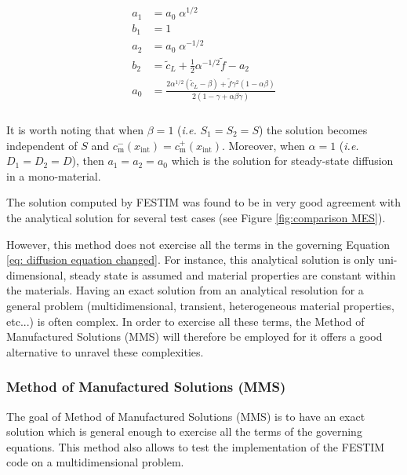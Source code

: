 \begin{align}
    \begin{split}
        a_1 &= a_0 \; \alpha^{1/2}  \\
        b_1 &= 1 \\
        a_2 &= a_0 \; \alpha^{-1/2}\\
        b_2 &= \tilde{c}_L + \frac{1}{2} \alpha^{-1/2} \tilde{f} - a_2 \\
        a_0 &= \frac{2 \alpha^{1/2}( \tilde{c}_L - \beta) + \tilde{f} \gamma^{2} ( 1 - \alpha \beta)}{2 \left( 1  - \gamma + \alpha \beta \gamma \right)} \\
    \end{split}
    \label{eq: MES c coefficients}
\end{align}

It is worth noting that when $\beta=1$ (\textit{i.e.} $S_1 = S_2 = S$) the solution becomes independent of $S$ and {$c_\mathrm{m}^{-}(x_\mathrm{int}) = c_\mathrm{m}^{+}(x_\mathrm{int})$}.
Moreover, when $\alpha = 1$ (\textit{i.e.} $D_1 = D_2 = D$), then $a_1 = a_2 = a_0$ which is the solution for steady-state diffusion in a mono-material.

The solution computed by FESTIM was found to be in very good agreement with the analytical solution for several test cases (see Figure \ref{fig:comparison MES}).

 
However, this method does not exercise all the terms in the governing Equation \ref{eq: diffusion equation changed}.
For instance, this analytical solution is only uni-dimensional, steady state is assumed and material properties are constant within the materials.
Having an exact solution from an analytical resolution for a general problem (multidimensional, transient, heterogeneous material properties, etc...) is often complex.
In order to exercise all these terms, the Method of Manufactured Solutions (MMS) will therefore be employed for it offers a good alternative to unravel these complexities.

\subsubsection{Method of Manufactured Solutions (MMS)}

The goal of Method of Manufactured Solutions (MMS) is to have an exact solution which is general enough to exercise all the terms of the governing equations.
This method also allows to test the implementation of the FESTIM code on a multidimensional problem.

